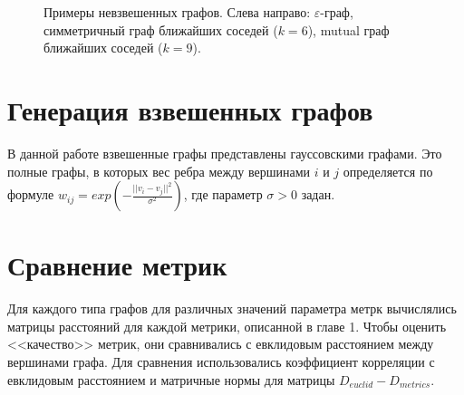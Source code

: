\begin{figure}[h]
  \begin{minipage}[h]{0.29\linewidth}
  \end{minipage}
  \hfill
  \begin{minipage}[h]{0.29\linewidth}
  \end{minipage}
  \hfill
  \begin{minipage}[h]{0.29\linewidth}
  \end{minipage}
  \caption{Примеры невзвешенных графов. Слева направо: $\varepsilon$-граф, симметричный граф ближайших соседей ($k=6$), mutual граф ближайших соседей ($k=9$).}
  \label{img:graphs}  
\end{figure}


\section{Генерация взвешенных графов} \label{sect2_3}

В данной работе взвешенные графы представлены гауссовскими графами. Это полные графы, в которых вес ребра между вершинами $i$ и $j$ определяется по формуле $w_{ij} = exp(-\frac{||v_i - v_j||^2} {\sigma^2} )$, где параметр $\sigma > 0$ задан.


\section{Сравнение метрик} \label{sect2_4}

Для каждого типа графов для различных значений параметра метрк вычислялись матрицы расстояний для каждой метрики, описанной в главе 1. Чтобы оценить <<качество>> метрик, они сравнивались с евклидовым расстоянием между вершинами графа. Для сравнения использовались коэффициент корреляции с евклидовым расстоянием и матричные нормы для матрицы $D_{euclid} - D_{metrics}$.


\clearpage
